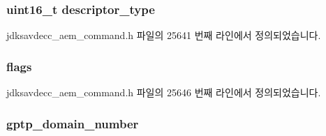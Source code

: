 \subsubsection[{\texorpdfstring{descriptor\+\_\+type}{descriptor_type}}]{\setlength{\rightskip}{0pt plus 5cm}uint16\+\_\+t descriptor\+\_\+type}\hypertarget{structjdksavdecc__aem__command__get__avb__info__response_ab7c32b6c7131c13d4ea3b7ee2f09b78d}{}\label{structjdksavdecc__aem__command__get__avb__info__response_ab7c32b6c7131c13d4ea3b7ee2f09b78d}


jdksavdecc\+\_\+aem\+\_\+command.\+h 파일의 25641 번째 라인에서 정의되었습니다.

\subsubsection[{\texorpdfstring{flags}{flags}}]{ flags}\hypertarget{structjdksavdecc__aem__command__get__avb__info__response_aa2585d779da0ab21273a8d92de9a0ebe}{}\label{structjdksavdecc__aem__command__get__avb__info__response_aa2585d779da0ab21273a8d92de9a0ebe}


jdksavdecc\+\_\+aem\+\_\+command.\+h 파일의 25646 번째 라인에서 정의되었습니다.

\subsubsection[{\texorpdfstring{gptp\+\_\+domain\+\_\+number}{gptp_domain_number}}]{ gptp\+\_\+domain\+\_\+number}\hypertarget{structjdksavdecc__aem__command__get__avb__info__response_ac53b4e61c0f960e16c86cfe678ca256d}{}\label{structjdksavdecc__aem__command__get__avb__info__response_ac53b4e61c0f960e16c86cfe678ca256d}


